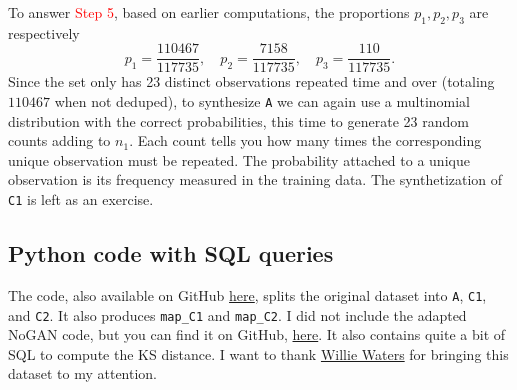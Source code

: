 \documentclass[oneside,10pt]{book}
\begin{document}
To answer \textcolor{red}{Step 5}, based on earlier computations,  the proportions $p_1, p_2, p_3$ are respectively
$$
p_1 = \frac{\num{110467}}{\num{117735}}, \quad p_2 =\frac{ 7158}{\num{117735}}, \quad p_3 = \frac{110}{\num{117735}}.
$$
Since the set  only has 23 distinct observations repeated time and over (totaling $\num{110467}$ when not deduped), to synthesize \texttt{A} we can again use a multinomial distribution with the correct probabilities, this time to generate 23 random counts
 adding to $n_1$. Each count
 tells you how many times the corresponding unique observation must be repeated. The probability attached to a unique observation is its
 frequency measured in the training data.
 The synthetization of \texttt{C1} is left as an exercise.


\subsection{Python code with SQL queries}\label{gfrk65zs}

The code, also available on GitHub  \href{https://github.com/VincentGranville/Main/blob/main/iot_security.py}{here},
 splits the original dataset into \texttt{A}, \texttt{C1}, and \texttt{C2}.
It also produces \texttt{map\_C1} and \texttt{map\_C2}. I did not include
 the adapted NoGAN code, but you can find it on GitHub,
 \href{https://github.com/VincentGranville/Main/blob/main/NoGAN_iot.py}{here}. It also contains quite a bit of SQL
 to compute the KS distance. I want to thank \href{https://www.linkedin.com/in/willie-waters-79451350/}{Willie Waters} for bringing this dataset to my attention. \vspace{1ex}
\end{document}
